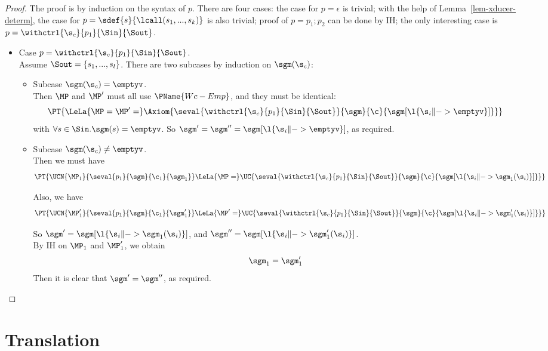 \begin{proof}
	The proof is by induction on the syntax of $p$. There are four cases: the case for $p = \epsilon$ is trivial; with the help of Lemma~\ref{lem-xducer-determ}, the case for $p = \sdef{s}{\lcall(s_1,...,s_k)}$ is also trivial; proof of $p = p_1; p_2$ can be done by IH; the only interesting case is $p = \withctrl{\s_c}{p_1}{\Sin}{\Sout}$.
	\begin{itemize}
		\item Case $p = \withctrl{\s_c}{p_1}{\Sin}{\Sout}$. \\
		Assume $\Sout = \{s_1,...,s_l\}$. There are two subcases by induction on $\sgm(\s_c)$: 
		\begin{itemize}
			\item Subcase $\sgm(\s_c) = \emptyv$. \\
			Then $\MP$ and $\MP'$ must all use $\PName{Wc-Emp}$, and they must be identical:		
			$$\PT{ 
				\LeLa{\MP= \MP' =}
				\Axiom{\seval{\withctrl{\s_c}{p_1}{\Sin}{\Sout}}{\sgm}{\c}{\sgm[\l{\s_i \|-> \emptyv}]}}
			}$$
			with $ \forall s \in \Sin. \sgm(s) = \emptyv$.
			So $\sgm' = \sgm'' = \sgm[\l{\s_i \|-> \emptyv}]$, as required. 
			
			\item Subcase $\sgm(\s_c) \neq \emptyv$. \\
			Then we must have
			$$\PT{
				\UCN{\MP_1}{\seval{p_1}{\sgm}{\c_1}{\sgm_1}}
				\LeLa{\MP = }
				\UC{\seval{\withctrl{\s_c}{p_1}{\Sin}{\Sout}}{\sgm}{\c}{\sgm[\l{\s_i \|-> \sgm_1(\s_i)}]}}
			}$$
			
			Also, we have
			$$\PT{
				\UCN{\MP'_1}{\seval{p_1}{\sgm}{\c_1}{\sgm'_1}}
				\LeLa{\MP' = }
				\UC{\seval{\withctrl{\s_c}{p_1}{\Sin}{\Sout}}{\sgm}{\c}{\sgm[\l{\s_i \|-> \sgm'_1(\s_i)}]}}
			}$$
			
			So $\sgm' = \sgm[\l{\s_i \|-> \sgm_1(\s_i)}]$, 
			and $\sgm'' = \sgm[\l{\s_i \|-> \sgm'_1(\s_i)}]$. \\
			By IH on $\MP_1$ and $\MP'_1$, we obtain
			$$\sgm_1 = \sgm_1'$$
			Then it is clear that $\sgm' = \sgm''$, as required.
			
		\end{itemize} 
		
	\end{itemize}
	
\end{proof}




\section{Translation}

